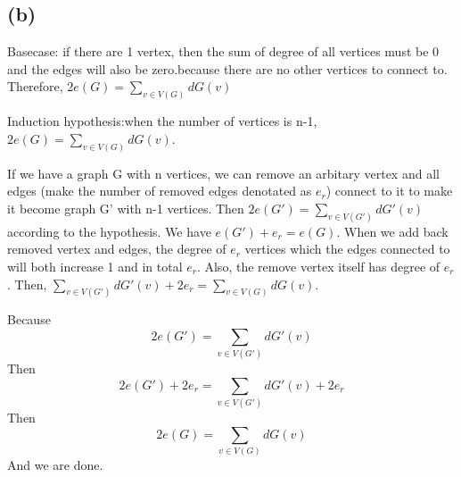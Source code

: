 \documentclass[11pt]{article}
\begin{document}
\subsection*{(b)}
Basecase: if there are 1 vertex, then the sum of degree of all vertices must be 0 and the edges will also be zero.because there are no other vertices to connect to. Therefore, $2e(G)=\sum_{v\in V(G)}dG(v)$

Induction hypothesis:when the number of vertices is n-1, $2e(G)=\sum_{v\in V(G)}dG(v)$.

If we have a graph G with n vertices, we can remove an arbitary vertex and all edges (make the number of removed edges denotated as $e_r$) connect to it to make it become graph G' with n-1 vertices. Then $2e(G')=\sum_{v\in V(G')}dG'(v)$ according to the hypothesis. We have $e(G')+e_r=e(G)$.  When we add back removed vertex and edges, the degree of $e_r$ vertices which the edges connected to will both increase 1 and in total $e_r$. Also, the remove vertex itself has degree of $e_r$. Then, $\sum_{v\in V(G')}dG'(v)+2e_r=\sum_{v\in V(G)}dG(v)$.

Because
$$2e(G')=\sum_{v\in V(G')}dG'(v)$$
Then
$$2e(G')+2e_r=\sum_{v\in V(G')}dG'(v)+2e_r$$
Then 
$$2e(G)=\sum_{v\in V(G)}dG(v)$$
And we are done.
\end{document}
